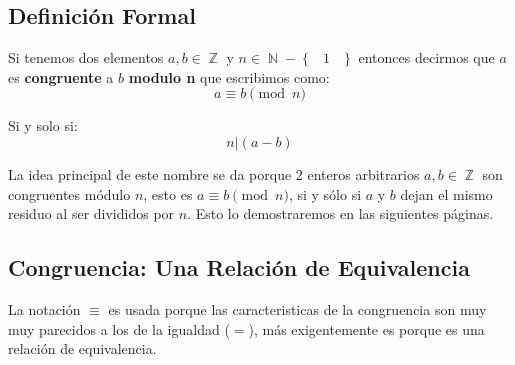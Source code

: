 \documentclass[12pt, fleqn]{report}                             %
\DeclareMathOperator \Space {\quad}                             %
\DeclareMathOperator \MiniSpace {\;}                            %
\newcommand{\Set}[1]{\left\{ \MiniSpace #1 \MiniSpace \right\}} %
\DeclareMathOperator \Naturals  {\mathbb{N}}                     %
\DeclareMathOperator \Integers  {\mathbb{Z}}                     %
\begin{document}
        \subsection*{Definición Formal}

            Si tenemos dos elementos $a, b \in \Integers$ y $n \in \Naturals - \Set{1}$
            entonces decirmos que $a$ es \textbf{congruente} a $b$ \textbf{modulo n}
            que escribimos como:
            \begin{equation}
                a \equiv b \pmod{n}
            \end{equation}

            Si y solo si:
            \begin{equation}
                n | (a - b)
            \end{equation}


            La idea principal de este nombre se da porque 2 enteros arbitrarios
            $a,b \in \Integers$ son congruentes módulo $n$, esto es
            $a \equiv b \pmod{n}$, si y sólo si $a$ y $b$ dejan el mismo
            residuo al ser divididos por $n$. Esto lo demostraremos en las
            siguientes páginas.



        \clearpage
        \subsection{Congruencia: Una Relación de Equivalencia}

            La notación $\equiv$ es usada porque las caracteristicas de la
            congruencia son muy muy parecidos a los de la igualdad ($=$), 
            más exigentemente es porque es una relación de equivalencia.
\end{document}
